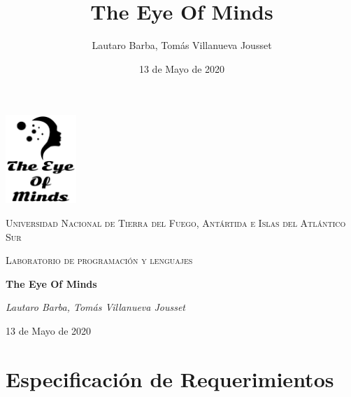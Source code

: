 \documentclass[a4paper, 11pt]{article}
\title{The Eye Of Minds}
\author{Lautaro Barba, Tomás Villanueva Jousset}
\date{13 de Mayo de 2020}
\begin{document}
\begin{titlepage}
\centering{}
    \includegraphics[width=0.2\textwidth]{LogoCompleto}\par
    \vspace{1cm}
    \textsc{\LARGE{Universidad Nacional de Tierra del Fuego, Antártida e Islas del Atlántico Sur}}\par
    \vspace{1cm}
    \textsc{\Large{Laboratorio de programación y lenguajes}}\par
    \vspace{1,5cm}
    \huge{\textbf{The Eye Of Minds}}\par
    \vspace{2cm}
    \Large{\textit{Lautaro Barba, Tomás Villanueva Jousset}}\par
    \vfill{}
    \large{13 de Mayo de 2020}\par
\end{titlepage}
\clearpage{}


\tableofcontents{}
\clearpage{}

\section{Especificación de Requerimientos}
\end{document}
